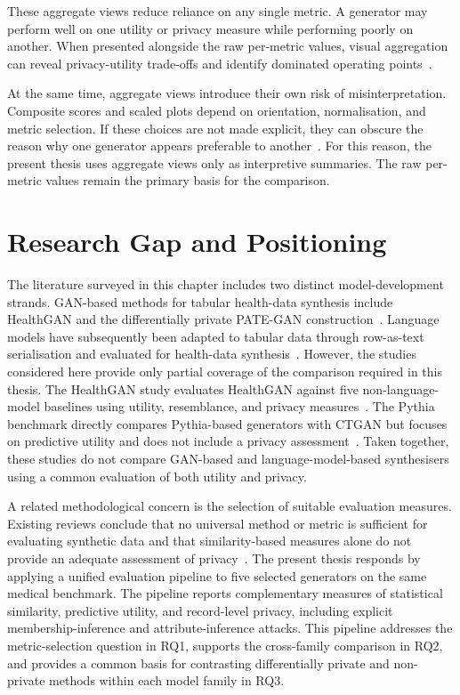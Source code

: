 These aggregate views reduce reliance on any single metric. A generator may
perform well on one utility or privacy measure while performing poorly on
another. When presented alongside the raw per-metric values, visual aggregation
can reveal privacy-utility trade-offs and identify dominated operating
points~\cite{lautrup2025syntheval,thees2025beyond}.

At the same time, aggregate views introduce their own risk of
misinterpretation. Composite scores and scaled plots depend on orientation,
normalisation, and metric selection. If these choices are not made
explicit, they can obscure the reason why one generator appears preferable
to another~\cite{thees2025beyond}. For this reason, the present thesis uses aggregate views only
as interpretive summaries. The raw per-metric values remain the primary
basis for the comparison.

\section{Research Gap and Positioning}
\label{sec:bg:gap}

The literature surveyed in this chapter includes two distinct
model-development strands. GAN-based methods for tabular health-data
synthesis include HealthGAN and the differentially private PATE-GAN
construction~\cite{healthgan,pategan}. Language models have subsequently
been adapted to tabular data through row-as-text serialisation and evaluated
for health-data synthesis~\cite{Borisov2023GReaT,Miletic2024}. However, the
studies considered here provide only partial coverage of the comparison
required in this thesis. The HealthGAN study evaluates HealthGAN against five
non-language-model baselines using utility, resemblance, and privacy
measures~\cite{healthgan}. The Pythia benchmark directly compares
Pythia-based generators with CTGAN but focuses on predictive utility and
does not include a privacy assessment~\cite{Miletic2024}. Taken together,
these studies do not compare GAN-based and language-model-based synthesisers
using a common evaluation of both utility and privacy.

A related methodological concern is the selection of suitable evaluation
measures. Existing reviews conclude that no universal method or metric is
sufficient for evaluating synthetic data and that similarity-based measures
alone do not provide an adequate assessment of
privacy~\cite{hernandez2022synthetic,kaabachi2025scoping}. The present thesis
responds by applying a unified evaluation pipeline to five selected
generators on the same medical benchmark. The pipeline reports complementary
measures of statistical similarity, predictive utility, and record-level
privacy, including explicit membership-inference and attribute-inference
attacks. This pipeline addresses the metric-selection question in RQ1,
supports the cross-family comparison in RQ2, and provides a common basis for
contrasting differentially private and non-private methods within each
model family in RQ3.


